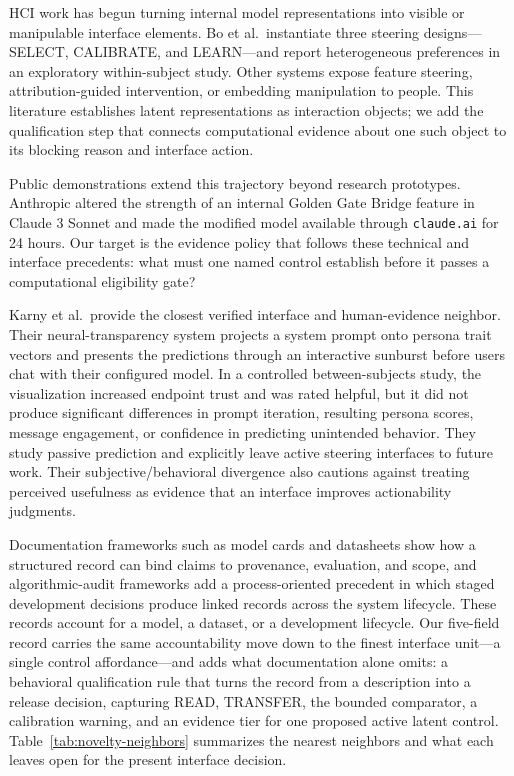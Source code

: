 \documentclass[manuscript,review,anonymous]{acmart}
\begin{document}
HCI work has begun turning internal model representations into visible or manipulable interface elements. Bo et al.~instantiate three steering designs---SELECT, CALIBRATE, and LEARN---and report heterogeneous preferences in an exploratory within-subject study. \cite{bo2026steerable} {}%
Other systems expose feature steering, attribution-guided intervention, or embedding manipulation to people. \cite{huang2025steering,labarta2026attribution,raval2026latman} {}%
This literature establishes latent representations as interaction objects; we add the qualification step that connects computational evidence about one such object to its blocking reason and interface action.

Public demonstrations extend this trajectory beyond research prototypes. Anthropic altered the strength of an internal Golden Gate Bridge feature in Claude 3 Sonnet and made the modified model available through \texttt{claude.ai} for 24 hours. \cite{anthropic2024goldengate} {}%
Our target is the evidence policy that follows these technical and interface precedents: what must one named control establish before it passes a computational eligibility gate?

Karny et al.~provide the closest verified interface and human-evidence neighbor. Their neural-transparency system projects a system prompt onto persona trait vectors and presents the predictions through an interactive sunburst before users chat with their configured model. In a controlled between-subjects study, the visualization increased endpoint trust and was rated helpful, but it did not produce significant differences in prompt iteration, resulting persona scores, message engagement, or confidence in predicting unintended behavior. \cite{karny2026neural} {}%
They study passive prediction and explicitly leave active steering interfaces to future work. Their subjective/behavioral divergence also cautions against treating perceived usefulness as evidence that an interface improves actionability judgments.

Documentation frameworks such as model cards and datasheets show how a structured record can bind claims to provenance, evaluation, and scope, and algorithmic-audit frameworks add a process-oriented precedent in which staged development decisions produce linked records across the system lifecycle. \cite{mitchell2019modelcards,gebru2021datasheets,raji2020accountability} {}%
These records account for a model, a dataset, or a development lifecycle. Our five-field record carries the same accountability move down to the finest interface unit---a single control affordance---and adds what documentation alone omits: a behavioral qualification rule that turns the record from a description into a release decision, capturing READ, TRANSFER, the bounded comparator, a calibration warning, and an evidence tier for one proposed active latent control. Table~\ref{tab:novelty-neighbors} summarizes the nearest neighbors and what each leaves open for the present interface decision.
\end{document}
